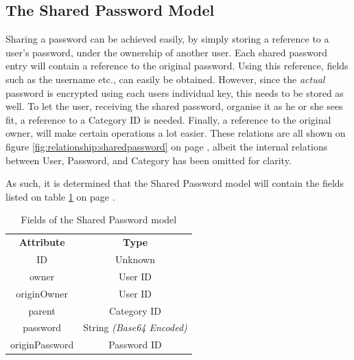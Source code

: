 		\subsection{The Shared Password Model}
			Sharing a password can be achieved easily, by simply storing a reference to a user's password, under the ownership of another user. Each shared password entry will contain a reference to the original password. Using this reference, fields such as the username etc., can easily be obtained. However, since the \emph{actual} password is encrypted using each users individual key, this needs to be stored as well. To let the user, receiving the shared password, organise it as he or she sees fit, a reference to a Category ID is needed. Finally, a reference to the original owner, will make certain operations a lot easier. These relations are all shown on figure \ref{fig:relationship:sharedpassword} on page \pageref{fig:relationship:sharedpassword}, albeit the internal relations between User, Password, and Category has been omitted for clarity.

			As such, it is determined that the Shared Password model will contain the fields listed on table \ref{fig:model:sharedpassword} on page \pageref{fig:model:sharedpassword}. 

			\begin{table}[p]
				\centering
				\begin{tabular}{c|c}
					\textbf{Attribute} 		& \textbf{Type} 		\\
					ID 						& Unknown 		\\
					owner 					& User ID \\
					originOwner 			& User ID \\
					parent 					& Category ID \\
					password 				& String \emph{(Base64 Encoded)} \\
					originPassword 			& Password ID 		\\
				\end{tabular}
				\caption{Fields of the Shared Password model}
				\label{fig:model:sharedpassword}
			\end{table}

